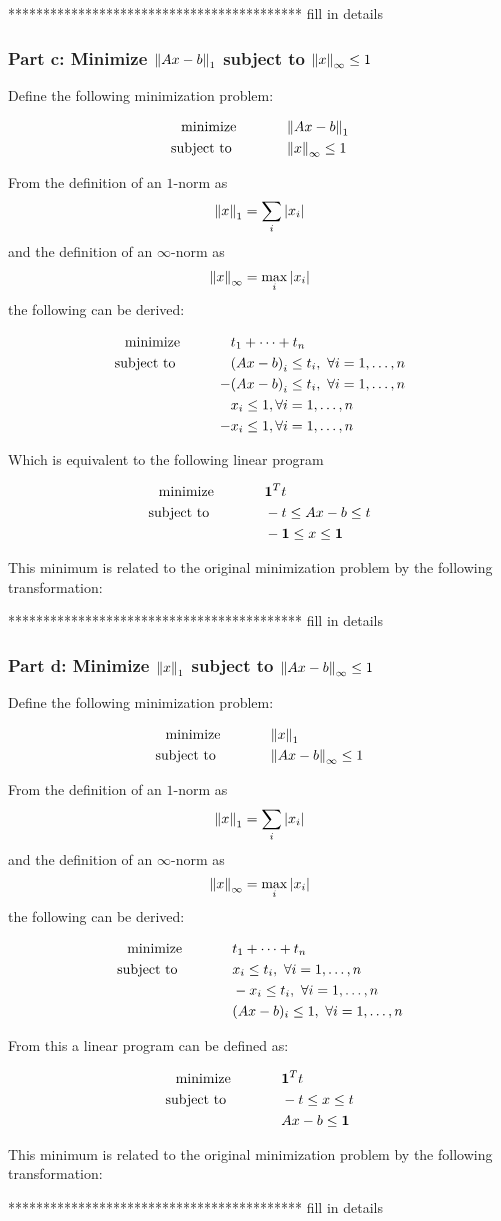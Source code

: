 \documentclass[letter]{article}
\newcommand{\optpblm}[3][eq:default]{
	\begin{equation}\label{#1}
		\begin{aligned}
			\text{minimize} \hspace{0.5in} &#2\vspace{5pt}\\
			\text{subject to \hspace{0.5in}} &#3
		\end{aligned}	
	\end{equation}
}
\begin{document}
****************************************** fill in details

\newpage
\subsubsection{Part c: Minimize $\norm{Ax-b}_1$ subject to $\norm{x}_{\infty}\leq 1$}
Define the following minimization problem:
\optpblm{\norm{Ax-b}_1}{\norm{x}_\infty \leq 1}
From the definition of an $1$-norm as $$\norm{x}_1 = \sum_i \abs{x_i}$$ and the definition of an $\infty$-norm as $$\norm{x}_\infty = \max_i \abs{x_i}$$ the following can be derived:
\optpblm{t_1 + \cdots + t_n}{\qty(Ax - b)_i\leq t_i, \ \forall i = 1,\dots,n\\
	-& \qty(Ax - b)_i\leq t_i, \ \forall i = 1,\dots,n\\
	 & x_i \leq 1, \forall i = 1,\dots,n\\
	-& x_i \leq 1, \forall i = 1,\dots,n}
Which is equivalent to the following linear program
\optpblm{\vb{1}^T t}{-t \leq Ax - b \leq t\\
					&-\vb{1} \leq x \leq \vb{1}}
This minimum is related to the original minimization problem by the following transformation:

****************************************** fill in details

\newpage
\subsubsection{Part d: Minimize $\norm{x}_1$ subject to $\norm{Ax-b}_\infty \leq 1$}
Define the following minimization problem:
\optpblm{\norm{x}_1}{\norm{Ax-b}_\infty \leq 1}
From the definition of an $1$-norm as $$\norm{x}_1 = \sum_i \abs{x_i}$$ and the definition of an $\infty$-norm as $$\norm{x}_\infty = \max_i \abs{x_i}$$ the following can be derived:
\optpblm{t_1 + \cdots + t_n}{x_i \leq t_i, \ \forall i = 1,\dots,n\\
							&-x_i \leq t_i, \ \forall i = 1,\dots,n\\
							&(Ax-b)_i \leq 1, \ \forall i = 1,\dots,n}
From this a linear program can be defined as:
\optpblm{\vb{1}^T t}{-t \leq x \leq t\\
			 		&Ax - b \leq \vb{1}}
This minimum is related to the original minimization problem by the following transformation:

****************************************** fill in details

\newpage
\end{document}
